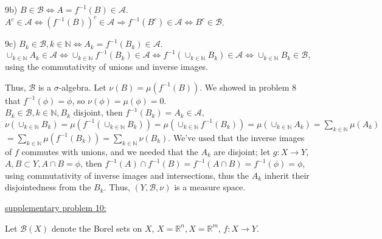 \documentclass[12pt]{article}
\begin{document}
\begin{flushleft}
9b) $B \in \mathcal{B} \Leftrightarrow A=f^{-1}(B) \in \mathcal{A}.$ $A^c \in \mathcal{A} \Leftrightarrow (f^{-1}(B))^c \in \mathcal{A} \Rightarrow f^{-1}(B^c) \in \mathcal{A} \Leftrightarrow B^c \in \mathcal{B}$.
\end{flushleft}

\begin{flushleft}
9c) $B_k \in \mathcal{B}, k \in \mathbb{N} \Leftrightarrow A_k=f^{-1}(B_k) \in \mathcal{A}.$ $\cup_{k \in \mathbb{N}} A_k \in \mathcal{A} \Leftrightarrow \cup_{k \in \mathbb{N}} f^{-1}(B_k)\in \mathcal{A}   \Leftrightarrow f^{-1} (\cup_{k \in \mathbb{N}} B_k)\in \mathcal{A} \Leftrightarrow \cup_{k \in \mathbb{N}} B_k \in \mathcal{B},$ using the commutativity of unions and inverse images.
\end{flushleft}

\begin{flushleft}
Thus, $\mathcal{B}$ is a $\sigma$-algebra. Let $\nu(B) = \mu(f^{-1}(B))$. We showed in problem 8 that $f^{-1}(\phi) = \phi$, so $\nu(\phi) = \mu(\phi) = 0.$ \\

$B_k \in \mathcal{B}, k\in \mathbb{N}, B_k$ disjoint, then $ f^{-1}(B_k) = A_k \in \mathcal{A}, $ $ \nu( \cup_{k\in \mathbb{N}} B_k ) = \mu( f^{-1}( \cup_{k\in \mathbb{N}} B_k) ) = \mu(  \cup_{k\in \mathbb{N}} f^{-1}( B_k) ) = \mu(  \cup_{k\in \mathbb{N}} A_k ) =  \sum_{k\in \mathbb{N}} \mu( A_k )$ $ = \sum_{k\in \mathbb{N}} \mu( f^{-1}(B_k) ) = \sum_{k\in \mathbb{N}} \nu( B_k )$. We've used that the inverse images of $f$ commutes with unions, and we  needed that the $A_k$ are disjoint; let $g: X \rightarrow Y$, $A,B \subset Y, A \cap B = \phi$, then $f^{-1}(A) \cap f^{-1}(B) = f^{-1} ( A \cap B ) = f^{-1} (\phi) = \phi $, using commutativity of inverse images and intersections, thus the $A_k$ inherit their disjointedness from the $B_k$.
 Thus, $(Y,\mathcal{B},\nu)$ is a measure space.
\end{flushleft}





\begin{flushleft}
\underline{supplementary problem 10:}
\end{flushleft}

\begin{flushleft}
Let $\mathcal{B}(X)$ denote the Borel sets on $X$, $X = \mathbb{R}^n, X = \mathbb{R}^m$, $f: X \rightarrow Y$.
\end{flushleft}
\end{document}
